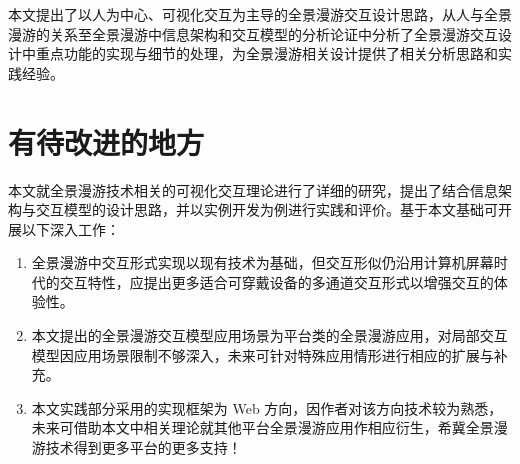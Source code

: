 本文提出了以人为中心、可视化交互为主导的全景漫游交互设计思路，从人与全景漫游的关系至全景漫游中信息架构和交互模型的分析论证中分析了全景漫游交互设计中重点功能的实现与细节的处理，为全景漫游相关设计提供了相关分析思路和实践经验。

\section{有待改进的地方}
本文就全景漫游技术相关的可视化交互理论进行了详细的研究，提出了结合信息架构与交互模型的设计思路，并以实例开发为例进行实践和评价。基于本文基础可开展以下深入工作：
\begin{enumerate}
	\item 全景漫游中交互形式实现以现有技术为基础，但交互形似仍沿用计算机屏幕时代的交互特性，应提出更多适合可穿戴设备的多通道交互形式以增强交互的体验性。
	\item 本文提出的全景漫游交互模型应用场景为平台类的全景漫游应用，对局部交互模型因应用场景限制不够深入，未来可针对特殊应用情形进行相应的扩展与补充。
    \item 本文实践部分采用的实现框架为 Web 方向，因作者对该方向技术较为熟悉，未来可借助本文中相关理论就其他平台全景漫游应用作相应衍生，希冀全景漫游技术得到更多平台的更多支持！
\end{enumerate}